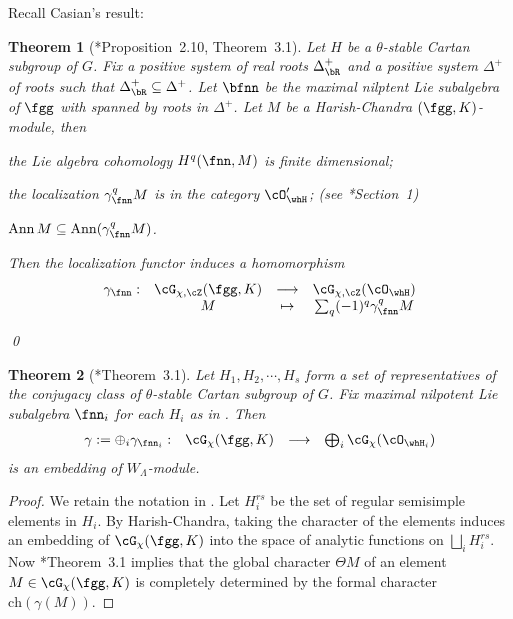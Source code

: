 \documentclass[12pt,a4paper]{amsart}
\DeclareMathOperator{\Ann}{Ann}
\numberwithin{equation}{section}
\newtheorem{thm}{Theorem}[section]
\theoremstyle{remark}
\def\WLam{W_{\Lambda}}
\begin{document}
Recall Casian's result:
\begin{thm}[\cite{Cas}*{Proposition~2.10, Theorem~3.1}]\label{thm:L1}
  Let $H$ be a $\theta$-stable Cartan subgroup of $G$.
  Fix a positive system of real roots $\DeltaRp$ and a positive system
  $\Delta^{+}$ of roots such that $\DeltaRp\subseteq \Delta^{+}$.
  Let $\bfnn$ be the maximal nilptent Lie subalgebra of $\fgg$ with spanned
  by roots in $\Delta^{+}$.
 Let $M$  be a Harish-Chandra $(\fgg,K)$-module, then
  \begin{enumT}
    \item the Lie algebra cohomology $H^{q}(\fnn,M)$ is finite dimensional;
    \item
    the localization $\gamma_{\fnn}^{q}M$ is in the category $\cO'_{\whH}$;
    (see \cite{Cas}*{Section~1})
    \item
    $\Ann M \subseteq \Ann (\gamma_{\fnn}^{q}M)$.
    \item
  Then the localization functor induces a homomorphism
  \[
    \begin{array}{cccc}
      \gamma_{\fnn}: &\Grt_{\chi,\cZ}(\fgg,K) &\longrightarrow & \Grt_{\chi,\cZ}(\cO_{\whH})\\
      & M &\mapsto & \sum_{q}  (-1)^{q} \gamma^{q}_{\fnn} M
    \end{array}
  \]
  \end{enumT}
  \qed
\end{thm}

\begin{thm}[\cite{Cas}*{Theorem~3.1}]
  Let $H_{1}, H_{2}, \cdots, H_{s}$ form a set of representatives of the
  conjugacy class of $\theta$-stable Cartan subgroup of $G$. Fix maximal
  nilpotent Lie subalgebra $\fnn_{i}$ for each $H_{i}$ as in .
  Then
  \[
    \begin{array}{cccc}
      \gamma:=\oplus_{i} \gamma_{\fnn_{i}}: &\Grt_{\chi}(\fgg,K)
      &\longrightarrow & \bigoplus_{i} \Grt_{\chi}(\cO_{\whH_{i}})\\
    \end{array}
  \]
  is an embedding of $\WLam$-module.
\end{thm}
\begin{proof}
  We retain the notation in \cite{Cas}.
  Let $H^{rs}_{i}$ be the set of regular semisimple elements in $H_{i}$. By
  Harish-Chandra, taking the character of the elements induces an embedding of
  $\Grt_{\chi}(\fgg,K)$ into the space of analytic functions on
  $\bigsqcup_{i} H^{rs}_{i}$. Now \cite{Cas}*{Theorem~3.1} implies that the
  global character $\Theta M$ of an element $M\in \Grt_{\chi}(\fgg,K)$ is
  completely determined by the formal character $\mathrm{ch}(\gamma(M))$.
\end{proof}
\end{document}
